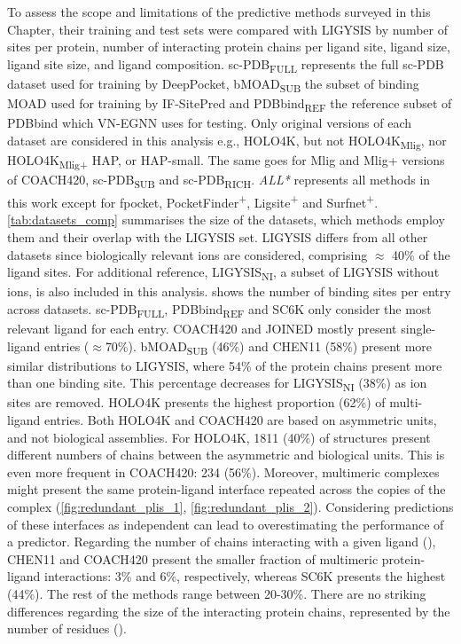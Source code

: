 To assess the scope and limitations of the predictive methods surveyed in this Chapter, their training and test sets were compared with LIGYSIS by number of sites per protein, number of interacting protein chains per ligand site, ligand size, ligand site size, and ligand composition. sc-PDB\textsubscript{FULL} represents the full sc-PDB dataset used for training by DeepPocket, bMOAD\textsubscript{SUB} the subset of binding MOAD used for training by IF-SitePred and PDBbind\textsubscript{REF} the reference subset of PDBbind which VN-EGNN uses for testing. Only original versions of each dataset are considered in this analysis e.g., HOLO4K, but not HOLO4K\textsubscript{Mlig}, nor HOLO4K\textsubscript{Mlig+} HAP, or HAP-small. The same goes for Mlig and Mlig+ versions of COACH420, sc-PDB\textsubscript{SUB} and sc-PDB\textsubscript{RICH}. \textit{ALL*} represents all methods in this work except for fpocket, PocketFinder\textsuperscript{+}, Ligsite\textsuperscript{+} and Surfnet\textsuperscript{+}. \autoref{tab:datasets_comp} summarises the size of the datasets, which methods employ them and their overlap with the LIGYSIS set. LIGYSIS differs from all other datasets since biologically relevant ions are considered, comprising $\approx$ 40\% of the ligand sites. For additional reference, LIGYSIS\textsubscript{NI}, a subset of LIGYSIS without ions, is also included in this analysis.  shows the number of binding sites per entry across datasets. sc-PDB\textsubscript{FULL}, PDBbind\textsubscript{REF} and SC6K only consider the most relevant ligand for each entry. COACH420 and JOINED mostly present single-ligand entries ($\approx$70\%). bMOAD\textsubscript{SUB} (46\%) and CHEN11 (58\%) present more similar distributions to LIGYSIS, where 54\% of the protein chains present more than one binding site. This percentage decreases for LIGYSIS\textsubscript{NI} (38\%) as ion sites are removed. HOLO4K presents the highest proportion (62\%) of multi-ligand entries. Both HOLO4K and COACH420 are based on asymmetric units, and not biological assemblies. For HOLO4K, 1811 (40\%) of structures present different numbers of chains between the asymmetric and biological units. This is even more frequent in COACH420: 234 (56\%). Moreover, multimeric complexes might present the same protein-ligand interface repeated across the copies of the complex (\autoref{fig:redundant_plis_1}, \autoref{fig:redundant_plis_2}). Considering predictions of these interfaces as independent can lead to overestimating the performance of a predictor. Regarding the number of chains interacting with a given ligand (), CHEN11 and COACH420 present the smaller fraction of multimeric protein-ligand interactions: 3\% and 6\%, respectively, whereas SC6K presents the highest (44\%). The rest of the methods range between 20-30\%. There are no striking differences regarding the size of the interacting protein chains, represented by the number of residues ().

